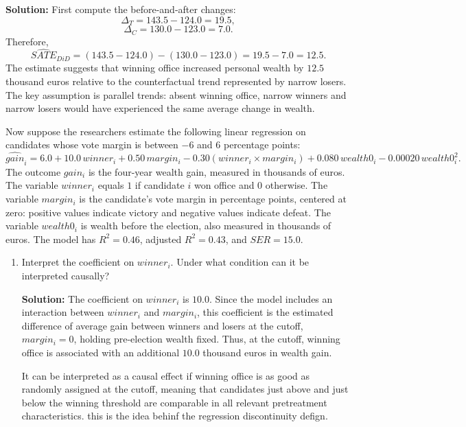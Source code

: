 \documentclass[11pt]{exam}
\begin{document}
\begin{questions}
\begin{enumerate}[leftmargin = 0.5cm, label = (\alph*), rightmargin = 0.2cm]
    \begin{solutionorbox}[6cm]
    \textbf{Solution:} First compute the before-and-after changes:
    \[
    \Delta_T=143.5-124.0=19.5,
    \]
    \[
    \Delta_C=130.0-123.0=7.0.
    \]
    Therefore,
    \[
    \widehat{SATE}_{DiD}=(143.5-124.0)-(130.0-123.0)=19.5-7.0=12.5.
    \]
    The estimate suggests that winning office increased personal wealth by $12.5$ thousand euros relative to the counterfactual trend represented by narrow losers. The key assumption is parallel trends: absent winning office, narrow winners and narrow losers would have experienced the same average change in wealth.
    \end{solutionorbox}
\end{enumerate}

\question[3]
Now suppose the researchers estimate the following linear regression on candidates whose vote margin is between $-6$ and $6$ percentage points:
\[
\widehat{gain}_i
=6.0+10.0\,winner_i+0.50\,margin_i-0.30(winner_i\times margin_i)
+0.080\,wealth0_i-0.00020\,wealth0_i^2.
\]
The outcome $gain_i$ is the four-year wealth gain, measured in thousands of euros. The variable $winner_i$ equals $1$ if candidate $i$ won office and $0$ otherwise. The variable $margin_i$ is the candidate's vote margin in percentage points, centered at zero: positive values indicate victory and negative values indicate defeat. The variable $wealth0_i$ is wealth before the election, also measured in thousands of euros. The model has $R^2=0.46$, adjusted $R^2=0.43$, and $SER=15.0$.

\begin{enumerate}[leftmargin = 0.5cm, label = (\alph*), rightmargin = 0.2cm]
    \item Interpret the coefficient on $winner_i$. Under what condition can it be interpreted causally?

    \begin{solutionorbox}[5.5cm]
    \textbf{Solution:} The coefficient on $winner_i$ is $10.0$. Since the model includes an interaction between $winner_i$ and $margin_i$, this coefficient is the estimated difference of average gain between winners and losers at the cutoff, $margin_i=0$, holding pre-election wealth fixed. Thus, at the cutoff, winning office is associated with an additional $10.0$ thousand euros in wealth gain.

    It can be interpreted as a causal effect if winning office is as good as randomly assigned at the cutoff, meaning that candidates just above and just below the winning threshold are comparable in all relevant pretreatment characteristics. this is the idea behinf the regression discontinuity defign.
    \end{solutionorbox}


\end{enumerate}
\end{questions}
\end{document}
